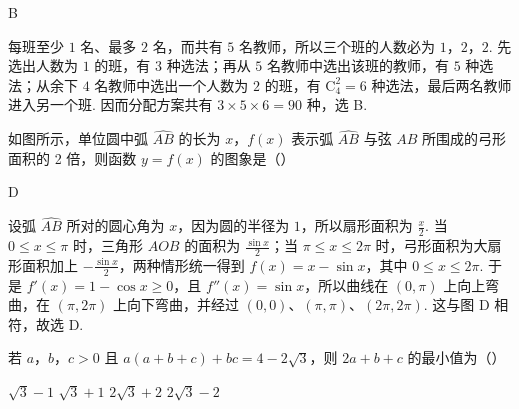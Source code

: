 \begin{answer}
B
\end{answer}

\begin{solution}
每班至少 \(1\) 名、最多 \(2\) 名，而共有 \(5\) 名教师，所以三个班的人数必为 \(1\)，\(2\)，\(2\). 先选出人数为 \(1\) 的班，有 \(3\) 种选法；再从 \(5\) 名教师中选出该班的教师，有 \(5\) 种选法；从余下 \(4\) 名教师中选出一个人数为 \(2\) 的班，有 \(\mathrm C_{4}^{2}=6\) 种选法，最后两名教师进入另一个班. 因而分配方案共有 \(3\times5\times6=90\) 种，选 B.
\end{solution}

\begin{problem}
如图所示，单位圆中弧 \(\widehat{AB}\) 的长为 \(x\)，\(f(x)\) 表示弧 \(\widehat{AB}\) 与弦 \(AB\) 所围成的弓形面积的 2 倍，则函数 \(y = f(x)\) 的图象是（\quad）


    {}
    {}
    {}
\end{problem}

\begin{answer}
D
\end{answer}

\begin{solution}
设弧 \(\widehat{AB}\) 所对的圆心角为 \(x\)，因为圆的半径为 \(1\)，所以扇形面积为 \(\frac{x}{2}\). 当 \(0\leqslant x\leqslant\pi\) 时，三角形 \(AOB\) 的面积为 \(\frac{\sin x}{2}\)；当 \(\pi\leqslant x\leqslant2\pi\) 时，弓形面积为大扇形面积加上 \(-\frac{\sin x}{2}\)，两种情形统一得到 \(f(x)=x-\sin x\)，其中 \(0\leqslant x\leqslant2\pi\). 于是 \(f'(x)=1-\cos x\geqslant0\)，且 \(f''(x)=\sin x\)，所以曲线在 \((0,\pi)\) 上向上弯曲，在 \((\pi,2\pi)\) 上向下弯曲，并经过 \((0,0)\)、\((\pi,\pi)\)、\((2\pi,2\pi)\). 这与图 D 相符，故选 D.
\end{solution}

\begin{problem}
若 \(a\)，\(b\)，\(c > 0\) 且 \(a(a + b + c) + bc = 4 - 2\sqrt{3}\)，则 \(2a + b + c\) 的最小值为（\quad）

\choices
    {\(\sqrt{3} - 1\)}
    {\(\sqrt{3} + 1\)}
    {\(2 \sqrt{3} + 2\)}
    {\(2 \sqrt{3} - 2\)}
\end{problem}

